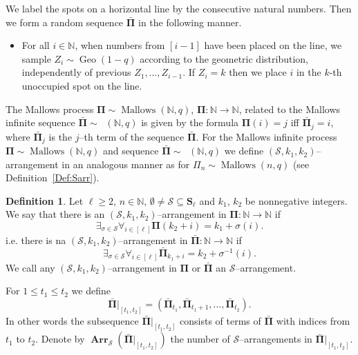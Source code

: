 \documentclass[letterpaper,11pt]{article}
\theoremstyle{definition}
\newtheorem{definition}[theorem]{Definition}
\theoremstyle{remark}
\renewcommand{\le}{\leqslant}
\renewcommand{\ge}{\geqslant}
\DeclareMathOperator{\Mallow}{Mallows}
\DeclareMathOperator{\Mallows}{Mallows_{seq}}
\newcommand{\bN}{\mathbb{N}}
\newcommand{\bS}{\mathbf{S}}
\newcommand{\Arr}{\ensuremath{\operatorname{\mathbf{Arr}}}}
\newcommand{\barPi}{\bar {\mathbf \Pi}}
\newcommand{\NN}{\mathbb{N}}
\newcommand{\cS}{\mathcal{S}}
\begin{document}
We label the spots on a horizontal line by the consecutive natural numbers. Then we form a random sequence $\barPi$ in the following manner.  
\begin{itemize}
	\item[] For all $i\in \NN$, when numbers from  $[i-1]$ have been placed on the line, we sample $Z_i\sim\operatorname{Geo}(1-q)$ according to the geometric distribution, independently of previous $Z_1,\ldots,Z_{i-1}$. If $Z_i=k$ then we place $i$ in the $k$-th unoccupied spot on the line.
\end{itemize}
The Mallows process  ${\mathbf \Pi}\sim\Mallow(\NN,q)$, ${\mathbf \Pi} : \bN\to\bN$, related to the Mallows infinite sequence $\barPi\sim\Mallows(\NN,q)$ is given by the formula ${\mathbf \Pi}(i)=j$ iff $\barPi_j=i$, where $\barPi_j$ is the $j$--th term of the sequence $\barPi$. 
For the Mallows infinite process ${\mathbf \Pi}\sim\Mallow(\bN,q)$ and sequence $\barPi\sim \Mallows(\NN,q)$ we define $(\cS,k_1,k_2)$--arrangement in an analogous manner as for $\varPi_n\sim \Mallow(n,q)$ (see Definition~\ref{Def:Sarr}).
\begin{definition}\label{Def:Sarr:barPi}
	Let $\ell\ge 2$, $n\in\bN$, $\emptyset\neq\cS\subseteq \bS_\ell$ and $k_1$, $k_2$ be nonnegative integers. We say that there is an $(\cS,k_1,k_2)$--arrangement in ${\mathbf \Pi}:\bN\to \bN$ if
	\begin{equation*}
		\exists_{\sigma\in\cS}\forall_{i\in [\ell]} {\mathbf \Pi}(k_2+i)=k_1+\sigma(i).
	\end{equation*}
	i.e. there is na $(\cS,k_1,k_2)$--arrangement in $\barPi:\bN\to\bN$ if
	\begin{equation}\label{Eq:SArr:barPi}
		\exists_{\sigma\in\cS}\forall_{i\in [\ell]} \barPi_{k_1+i}=k_2+\sigma^{-1}(i).
	\end{equation}
	We call any  $(\cS,k_1,k_2)$--arrangement in ${\mathbf \Pi}$ or $\barPi$ an  $\cS$--arrangement.
\end{definition}



For  $1\le t_1 \le t_2$ we define
\begin{equation}\label{Eq:Def:barPi:Obciety}
	\barPi|_{[t_1,t_2]}=(\barPi_{t_1},\barPi_{t_1+1},\ldots,\barPi_{t_2}).
\end{equation}
In other words the subsequence $\barPi|_{[t_1,t_2]}$ consists of terms of $\barPi$ with indices from $t_1$ to $t_2$. 
Denote by $\Arr_{\cS}(\barPi|_{[t_1,t_2]})$ the number of $\cS$--arrangements in $\barPi|_{[t_1,t_2]}$. 	
\end{document}
